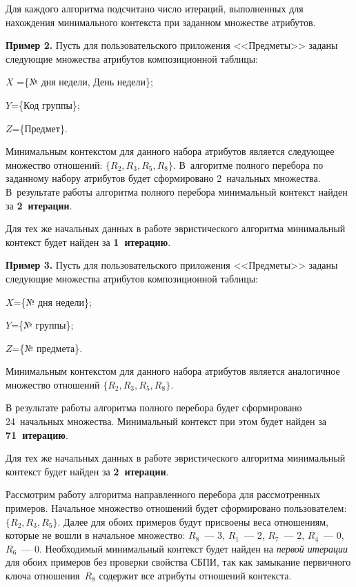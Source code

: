 \begin{multicols}{2}
  Для каждого алгоритма подсчитано число итераций, выполненных для 
нахождения минимального контекста при заданном множестве атрибутов.
  
  \medskip
  
  \noindent
  \textbf{Пример 2.} Пусть для пользовательского приложения <<Предметы>> 
заданы следующие множества атрибутов композиционной таблицы:
  
$X$\; =\;\{№ дня недели, День недели\};

$Y$\;=\;\{Код группы\};

$Z$\;=\;\{Предмет\}.
  
  Минимальным контекстом для данного набора атрибутов является 
следующее множество отношений: $\{R_2, R_3, R_5, R_8\}$. В~алгоритме 
полного перебора по заданному набору атрибутов будет сформировано 
2~начальных множества. В~результате работы алгоритма полного перебора 
минимальный контекст найден за \textbf{2~итерации}.
  
  Для тех же начальных данных в работе эвристического алгоритма 
минимальный контекст будет найден за \textbf{1~итерацию}.
  
  \smallskip
  
  \noindent
  \textbf{Пример 3.} Пусть для пользовательского приложения <<Предметы>> 
заданы следующие множества атрибутов композиционной таблицы:
  
$X$\;=\;\{№ дня недели\};

$Y$\;=\;\{№ группы\};

$Z$\;=\;\{№ предмета\}.

  Минимальным контекстом для данного набора атрибутов является 
аналогичное множество отношений $\{R_2, R_3, R_5, R_8\}$.
  
  В результате работы алгоритма полного перебора будет сформировано 
24~начальных множества. Минимальный контекст при этом будет найден за 
\textbf{71~итерацию}.
  
  Для тех же начальных данных в работе эвристического алгоритма 
минимальный контекст будет найден за \textbf{2~итерации}.
  
  \smallskip
  
  Рассмотрим работу алгоритма направленного перебора для рассмотренных 
примеров. Начальное множество отношений будет сформировано 
пользователем: $\{R_2, R_3, R_5\}$. Далее для обоих примеров будут присвоены 
веса отношениям, которые не вошли в начальное множество: $R_8$~--- 3, $R_1$~--- 
2, $R_7$~--- 2, $R_4$~--- 0, $R_6$~--- 0. Необходимый минимальный контекст будет 
найден на \textit{первой итерации} для обоих примеров без проверки свойства 
СБПИ, так как замыкание первичного ключа отношения~$R_8$ содержит все 
атрибуты отношений контекста.
  

\end{multicols}
